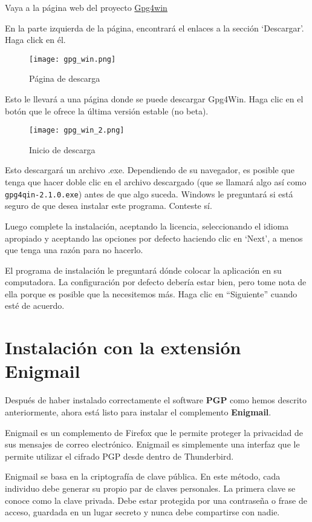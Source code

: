 \documentclass[10pt,a5paper,twoside,,]{book}
\begin{document}
Vaya a la página web del proyecto \href{http://gpg4win.org/}{Gpg4win}

En la parte izquierda de la página, encontrará el enlaces a la sección
`Descargar'. Haga click en él.

\begin{figure}[htbp]
\centering
\texttt{[image: gpg\_win.png]}
\caption{Página de descarga}
\end{figure}

Esto le llevará a una página donde se puede descargar Gpg4Win. Haga clic
en el botón que le ofrece la última versión estable (no beta).

\begin{figure}[htbp]
\centering
\texttt{[image: gpg\_win\_2.png]}
\caption{Inicio de descarga}
\end{figure}

Esto descargará un archivo .exe. Dependiendo de su navegador, es posible
que tenga que hacer doble clic en el archivo descargado (que se llamará
algo así como \texttt{gpg4qin-2.1.0.exe}) antes de que algo suceda.
Windows le preguntará si está seguro de que desea instalar este
programa. Conteste sí.

Luego complete la instalación, aceptando la licencia, seleccionando el
idioma apropiado y aceptando las opciones por defecto haciendo clic en
`Next', a menos que tenga una razón para no hacerlo.

El programa de instalación le preguntará dónde colocar la aplicación en
su computadora. La configuración por defecto debería estar bien, pero
tome nota de ella porque es posible que la necesitemos más. Haga clic en
``Siguiente'' cuando esté de acuerdo.

\section{Instalación con la extensión
Enigmail}\label{instalaciuxf3n-con-la-extensiuxf3n-enigmail}

Después de haber instalado correctamente el software \textbf{PGP} como
hemos descrito anteriormente, ahora está listo para instalar el
complemento \textbf{Enigmail}.

Enigmail es un complemento de Firefox que le permite proteger la
privacidad de sus mensajes de correo electrónico. Enigmail es
simplemente una interfaz que le permite utilizar el cifrado PGP desde
dentro de Thunderbird.

Enigmail se basa en la criptografía de clave pública. En este método,
cada individuo debe generar su propio par de claves personales. La
primera clave se conoce como la clave privada. Debe estar protegida por
una contraseña o frase de acceso, guardada en un lugar secreto y nunca
debe compartirse con nadie.
\end{document}
